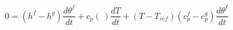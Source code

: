 \begin{equation}
0= (h^f-h^g) \frac{d\theta^f }{dt} + c_p(\ ) \frac{d T}{dt} +  (T- T_{ref}) (c_p^f-c_p^g) \frac{d\theta^f }{dt}
\end{equation}